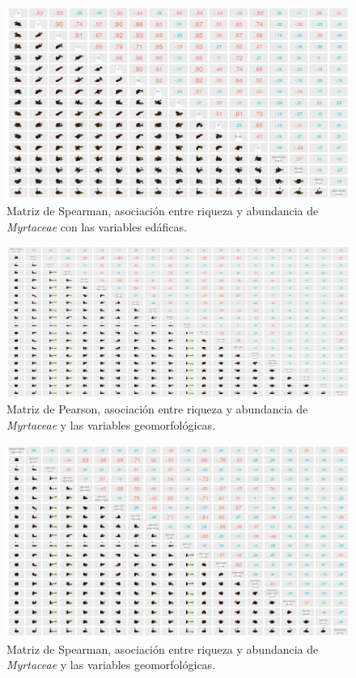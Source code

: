 \documentclass[11pt,]{article}
\begin{document}
\begin{figure}
\centering
\includegraphics[width=1.00000\textwidth]{matriz_correlacion_suelo_abun_riq_spearman.png}
\caption{Matriz de Spearman, asociación entre riqueza y abundancia de
\emph{Myrtaceae} con las variables edáficas.\label{fig:mspearman}}
\end{figure}

\begin{figure}
\centering
\includegraphics[width=1.00000\textwidth]{Matriz_correlacion_pearson.png}
\caption{Matriz de Pearson, asociación entre riqueza y abundancia de
\emph{Myrtaceae} y las variables
geomorfológicas.\label{fig:pearson_geom}}
\end{figure}

\begin{figure}
\centering
\includegraphics[width=1.00000\textwidth]{matriz_correlacion_geomorf_abun_riq_spearman.png}
\caption{Matriz de Spearman, asociación entre riqueza y abundancia de
\emph{Myrtaceae} y las variables
geomorfológicas.\label{fig:spearm_geom}}
\end{figure}
\end{document}
